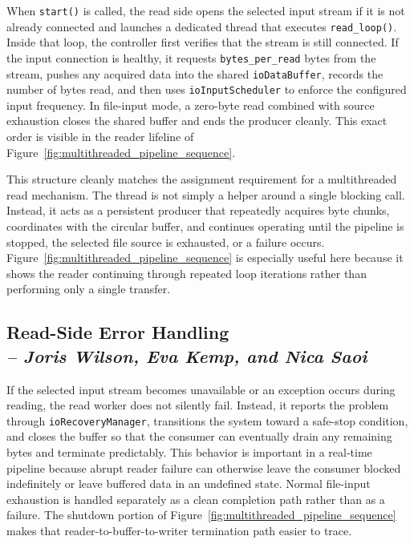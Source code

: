 When \texttt{start()} is called, the read side opens the selected input stream if it is not already connected and launches a dedicated thread that executes \texttt{read\_loop()}. Inside that loop, the controller first verifies that the stream is still connected. If the input connection is healthy, it requests \texttt{bytes\_per\_read} bytes from the stream, pushes any acquired data into the shared \texttt{ioDataBuffer}, records the number of bytes read, and then uses \texttt{ioInputScheduler} to enforce the configured input frequency. In file-input mode, a zero-byte read combined with source exhaustion closes the shared buffer and ends the producer cleanly. This exact order is visible in the reader lifeline of Figure~\ref{fig:multithreaded_pipeline_sequence}.

This structure cleanly matches the assignment requirement for a multithreaded read mechanism. The thread is not simply a helper around a single blocking call. Instead, it acts as a persistent producer that repeatedly acquires byte chunks, coordinates with the circular buffer, and continues operating until the pipeline is stopped, the selected file source is exhausted, or a failure occurs. Figure~\ref{fig:multithreaded_pipeline_sequence} is especially useful here because it shows the reader continuing through repeated loop iterations rather than performing only a single transfer.

\subsection{Read-Side Error Handling \\
\small{\textit{-- Joris Wilson, Eva Kemp, and Nica Saoi}}}
\label{Section::Read-Side Error Handling}

If the selected input stream becomes unavailable or an exception occurs during reading, the read worker does not silently fail. Instead, it reports the problem through \texttt{ioRecoveryManager}, transitions the system toward a safe-stop condition, and closes the buffer so that the consumer can eventually drain any remaining bytes and terminate predictably. This behavior is important in a real-time pipeline because abrupt reader failure can otherwise leave the consumer blocked indefinitely or leave buffered data in an undefined state. Normal file-input exhaustion is handled separately as a clean completion path rather than as a failure. The shutdown portion of Figure~\ref{fig:multithreaded_pipeline_sequence} makes that reader-to-buffer-to-writer termination path easier to trace.

